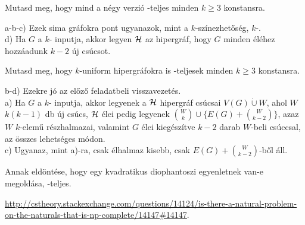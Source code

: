 \begin{Exercise}[counter={sorszam}, difficulty=0]
	Mutasd meg, hogy mind a n\'egy verzi\'o \NP-teljes minden $k\ge 3$ konstansra.
\end{Exercise}	
\begin{Answer}
	a-b-c) Ezek sima gr\'afokra pont ugyanazok, mint a $k$-sz\'inezhet\H os\'eg, $k$-.\\
	d) Ha $G$ a $k$- inputja, akkor legyen $\mathcal{H}$ az  hipergr\'af, hogy $G$ minden \'el\'ehez hozz\'aadunk $k-2$ \'uj cs\'ucsot.
\end{Answer}

\begin{Exercise}[counter={sorszam}, difficulty=0]
	Mutasd meg, hogy $k$-uniform hipergr\'afokra is \NP-teljesek minden $k\ge 3$ konstansra.
\end{Exercise}	
\begin{Answer}
	b-d) Ezekre j\'o az el\H oz\H o feladatbeli visszavezet\'es.\\
	a) Ha $G$ a $k$- inputja, akkor legyenek a $\mathcal{H}$ hipergr\'af cs\'ucsai $V(G)\dot\cup W$, ahol $W$ $k(k-1)$ db \'uj cs\'ucs, $\mathcal{H}$ \'elei pedig legyenek $\binom Wk\cup \{E(G)+\binom W{k-2}\}$, azaz $W$ $k$-elem\H u r\'eszhalmazai, valamint $G$ \'elei kieg\'esz\'itve $k-2$ darab $W$-beli cs\'uccsal, az \"osszes lehets\'eges m\'odon.\\
	c) Ugyanaz, mint a)-ra, csak \'elhalmaz kisebb, csak $E(G)+\binom W{k-2}$-b\H ol \'all.
\end{Answer}


\begin{Exercise}[counter={sorszam}, difficulty=2]
	Annak eldöntése, hogy egy kvadratikus diophantoszi egyenletnek van-e
	megold\'asa, \NP-teljes.
\end{Exercise}	
\begin{Answer}
	\url{http://cstheory.stackexchange.com/questions/14124/is-there-a-natural-problem-on-the-naturals-that-is-np-complete/14147#14147}.
\end{Answer}


